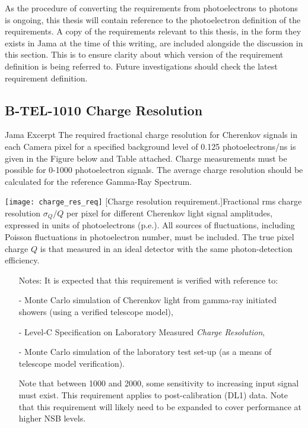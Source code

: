 As the procedure of converting the requirements from photoelectrons to photons is ongoing, this thesis will contain reference to the photoelectron definition of the requirements. A copy of the requirements relevant to this thesis, in the form they exists in Jama at the time of this writing, are included alongside the discussion in this section. This is to ensure clarity about which version of the requirement definition is being referred to. Future investigations should check the latest requirement definition. \vfill

\subsection{B-TEL-1010 Charge Resolution} \label{section:cr}

\begin{requirement}{Jama Excerpt} 
	The required fractional charge resolution for Cherenkov signals in each Camera pixel for a specified background level of 0.125 photoelectrons/ns is given in the Figure below and Table attached. Charge measurements must be possible for 0-1000 photoelectron signals. The average charge resolution should be calculated for the reference Gamma-Ray Spectrum.
    
	\centering\texttt{[image: charge\_res\_req]}
	[Charge resolution requirement.]{Fractional rms charge resolution $\sigma_Q/Q$ per pixel for different Cherenkov light signal amplitudes, expressed in units of photoelectrons (p.e.). All sources of fluctuations, including Poisson fluctuations in photoelectron number, must be included. The true pixel charge $Q$ is that measured in an ideal detector with the same photon-detection efficiency. }\label{fig:charge_res_req}
    
\begin{itemize}
\item [Notes:] It is expected that this requirement is verified with reference to:

- Monte Carlo simulation of Cherenkov light from gamma-ray initiated showers (using a verified telescope model),

- Level-C Specification on Laboratory Measured \textit{Charge Resolution},

- Monte Carlo simulation of the laboratory test set-up (as a means of telescope model verification).

Note that between \SI{1000}{\pe} and \SI{2000}{\pe}, some sensitivity to increasing input signal must exist. \newline
This requirement applies to post-calibration (DL1) data. \newline
Note that this requirement will likely need to be expanded to cover performance at higher NSB levels.
\end{itemize}
\end{requirement}

